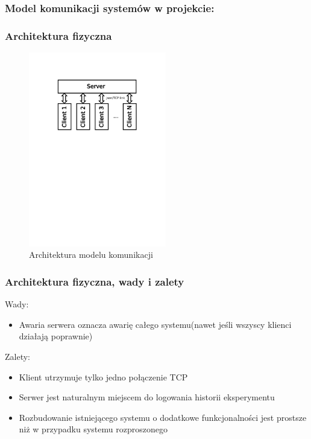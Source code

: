 \documentclass{beamer}
\begin{document}
  \begin{frame}
      \frametitle{Model komunikacji systemów w projekcie:}
  \end{frame}
  
  \begin{frame}
    \frametitle{Architektura fizyczna}
    
    \begin{figure}[!htb]
      \begin{center}
        \includegraphics[width=6cm,trim=4cm 17.5cm 4cm 4cm,clip]
        {../res/img/arch_diagram.pdf}
      \end{center}
      \caption{Architektura modelu komunikacji}
      \label{plot:x1}
    \end{figure}
  \end{frame}
  
  \begin{frame}
    \frametitle{Architektura fizyczna, wady i zalety}
    Wady:
    \begin{itemize}
      \item <1-> Awaria serwera oznacza awarię całego systemu(nawet jeśli
      wszyscy klienci działają poprawnie)
    \end{itemize}
    Zalety:
    \begin{itemize}
      \item <1-> Klient utrzymuje tylko jedno połączenie TCP
      \item <1-> Serwer jest naturalnym miejscem do logowania historii
      eksperymentu
      \item <1-> Rozbudowanie istniejącego systemu o dodatkowe funkcjonalności
      jest prostsze niż w przypadku systemu rozproszonego
    \end{itemize}
  \end{frame}
  
\end{document}
